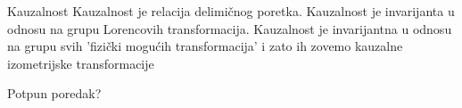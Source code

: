 \documentclass{beamer}
\begin{document}
    \begin{frame}{Kauzalnost}
        Kauzalnost je relacija delimičnog poretka.
        Kauzalnost je invarijanta u odnosu na grupu Lorencovih transformacija.
        Kauzalnost je invarijantna u odnosu na grupu svih
        'fizički mogućih transformacija' i zato ih zovemo kauzalne
        izometrijske transformacije
    \end{frame}
    \begin{frame}{Potpun poredak?}
    \end{frame}
\end{document}
